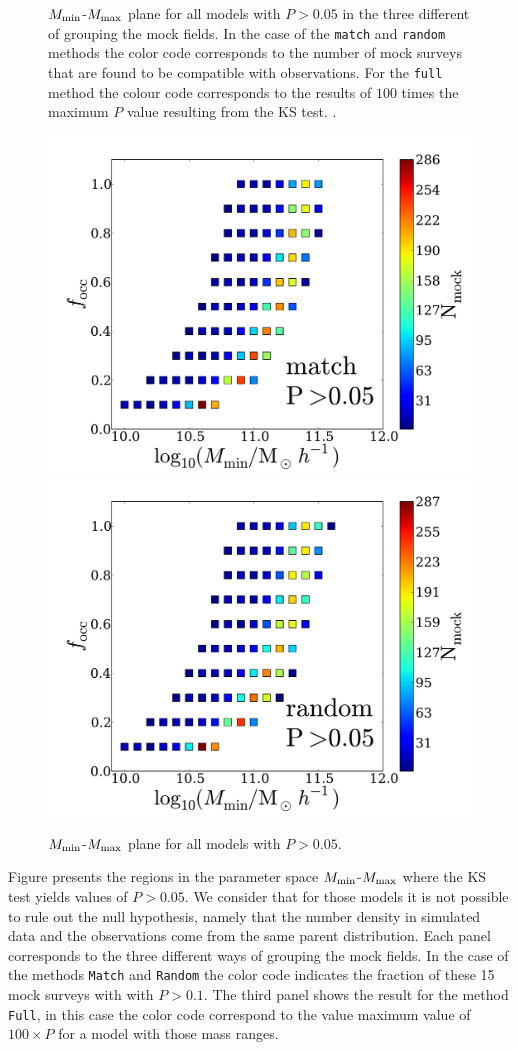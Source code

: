 \documentclass[usenatbib]{mn2e}
\begin{document}
\begin{figure}
\begin{center}
\end{center} 
\caption{$M_{\rm min}$-$M_{\rm max}$ plane for all models with
  $P>0.05$ in the three different of grouping the mock fields. In the
  case of the {\tt match} and {\tt random} methods the  color code
  corresponds to the number of mock surveys that are found to
  be compatible with observations. For the {\tt full} method the
  colour code corresponds to the results of $100$ times the maximum $P$ value
  resulting from the KS test. \label{figure:landscape}.}  
\end{figure}


\begin{figure}
\begin{center}
\includegraphics[width=0.46\linewidth,angle=0]{./plots/Fig3_match_P5.pdf}
\hspace{5mm}
\includegraphics[width=0.46\linewidth,angle=0]{./plots/Fig3_random_P5.pdf}\\
\end{center} 
\caption{$M_{\rm min}$-$M_{\rm max}$ plane for all models with
  $P>0.05$\label{figure:f_escape}.} 
\end{figure}


Figure \label{figure:landscape} presents the regions in the parameter
space $M_{\rm min}$-$M_{\rm max}$ where the KS test yields values of
$P>0.05$. We consider that for those models it is not possible to rule out the null
hypothesis, namely that the number density in simulated data and the observations come
from the same parent distribution. Each panel corresponds to the three different ways of
grouping the mock fields. In the case of the methods {\tt{Match}}
and {\tt{Random}} the color code indicates the fraction of these 15
mock surveys with with $P>0.1$. The third panel shows the result for
the method {\tt{Full}}, in this case the color code correspond
to the value maximum value of $100\times P$ for a model with those
mass ranges.
\end{document}
